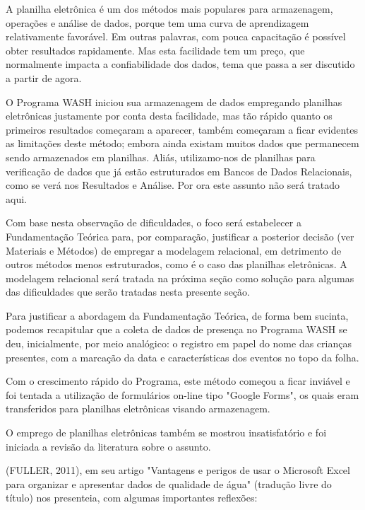 A planilha eletrônica é um dos métodos mais populares para armazenagem, operações e análise de dados, porque tem uma curva de aprendizagem relativamente favorável. Em outras palavras, com pouca capacitação é possível obter resultados rapidamente. Mas esta facilidade tem um preço, que normalmente impacta a confiabilidade dos dados, tema que passa a ser discutido a partir de agora.

O Programa WASH iniciou sua armazenagem de dados empregando planilhas eletrônicas justamente por conta desta facilidade, mas tão rápido quanto os primeiros resultados começaram a aparecer, também começaram a ficar evidentes as limitações deste método; embora ainda existam muitos dados que permanecem sendo armazenados em planilhas. Aliás, utilizamo-nos de planilhas para verificação de dados que já estão estruturados em Bancos de Dados Relacionais, como se verá nos Resultados e Análise. Por ora este assunto não será tratado aqui.

Com base nesta observação de dificuldades, o foco  será estabelecer a Fundamentação Teórica para, por comparação, justificar a posterior decisão (ver Materiais e Métodos) de empregar a modelagem relacional, em detrimento de outros métodos menos estruturados, como é o caso das planilhas eletrônicas. A modelagem relacional será tratada na próxima seção como solução para algumas das dificuldades que serão tratadas nesta presente seção.

Para justificar a abordagem da Fundamentação Teórica, de forma bem sucinta, podemos recapitular que a coleta de dados de presença no  Programa WASH se deu, inicialmente, por meio analógico: o registro em papel do nome das crianças presentes, com a marcação da data e características dos eventos no topo da folha.

Com o crescimento rápido do Programa, este método começou a ficar inviável e foi tentada a utilização de formulários on-line tipo "Google Forms", os quais eram transferidos para planilhas eletrônicas visando armazenagem.

O emprego de planilhas eletrônicas também se mostrou insatisfatório e foi iniciada a revisão da literatura sobre o assunto.

(FULLER, 2011), em seu artigo "Vantagens e perigos de usar o Microsoft Excel para organizar e apresentar dados de qualidade de água" (tradução livre do título) nos presenteia, com algumas importantes reflexões:


\noindent\begin{center}\mbox{\centering{}}\end{center}


